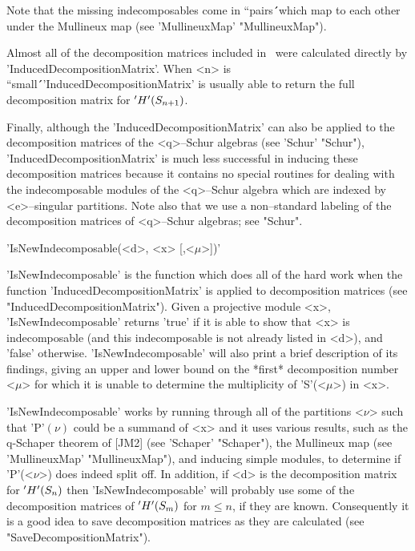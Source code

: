 Note that the missing indecomposables come in ``pairs\'\'\ which map to 
each other under the Mullineux map (see 'MullineuxMap' "MullineuxMap").

Almost all of the decomposition matrices included in \Specht\ were 
calculated directly by 'InducedDecompositionMatrix'. When <n> is 
``small\'\'\ 'InducedDecompositionMatrix' is usually able to return the 
full decomposition matrix for $'H'(S_{n+1})$.

Finally, although the 'InducedDecompositionMatrix' can also be applied to 
the decomposition matrices of the <q>--Schur algebras (see 'Schur' 
"Schur"), 'InducedDecompositionMatrix' is much less successful in inducing
these decomposition matrices because it contains no special routines for 
dealing with the indecomposable modules of the <q>--Schur algebra which 
are indexed by <e>--singular partitions.  Note also that we use a 
non--standard labeling of the decomposition matrices of <q>--Schur 
algebras; see "Schur".



'IsNewIndecomposable(<d>, <x> [,<$\mu$>])'

'IsNewIndecomposable' is the function which does all of the hard work when
the function 'InducedDecompositionMatrix' is applied to decomposition 
matrices (see "InducedDecompositionMatrix"). Given a projective module 
<x>, 'IsNewIndecomposable' returns 'true' if it is able to show that <x> 
is indecomposable (and this indecomposable is not already listed in <d>), 
and 'false' otherwise. 'IsNewIndecomposable' will also print a brief 
description of its findings, giving an upper and lower bound on the 
*first* decomposition number <$\mu$> for which it is unable to determine 
the multiplicity of 'S'(<$\mu$>) in <x>.

'IsNewIndecomposable' works by running through all of the partitions 
<$\nu$> such that 'P'$(\nu)$ could be a summand of <x> and it uses various
results, such as the q-Schaper theorem of [JM2] (see 'Schaper' "Schaper"),
the Mullineux map (see 'MullineuxMap' "MullineuxMap"), and inducing simple 
modules, to determine if 'P'(<$\nu$>) does indeed split off. In addition, 
if <d> is the decomposition matrix for $'H'(S_n)$ then 
'IsNewIndecomposable' will probably use some of the decomposition matrices
of $'H'(S_m)$ for $m\le n$, if they are known. Consequently it is 
a good idea to save decomposition matrices as they are calculated (see
"SaveDecompositionMatrix").

